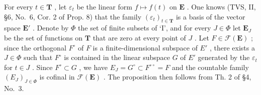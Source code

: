 For every \(t \in \mathbf{T}\) , let \(\varepsilon_t\) be the linear form \(f \mapsto f(t)\) on \(\mathbf{E}\) . One knows (TVS, II, §6, No.~6, Cor. 2 of Prop. 8) that the family \((\varepsilon_t)_{t \in \mathbf{T}}\) is a basis of the vector space \(\mathbf{E}'\) . Denote by \(\Phi\) the set of finite subsets of `I', and for every \(J \in \Phi\) let \(\mathbf{E}_J\) be the set of functions on \(\mathbf{T}\) that are zero at every point of \(J\) . Let \(F \in \mathcal{F}(\mathbf{E})\) ; since the orthogonal \(F^\circ\) of \(F\) is a finite-dimensional subspace of \(E'\) , there exists a \(J \in \Phi\) such that \(F^\circ\) is contained in the linear subspace \(G\) of \(E'\) generated by the \(\varepsilon_t\) for \(t \in J\) . Since \(F^\circ \subset G\) , we have \(E_J = G^\circ \subset F^{\circ\circ} = F\) and the countable family \((E_J)_{J \in \Phi}\) is cofinal in \(\mathcal{F}(\mathbf{E})\) . The proposition then follows from Th. 2 of §4, No.~3.

